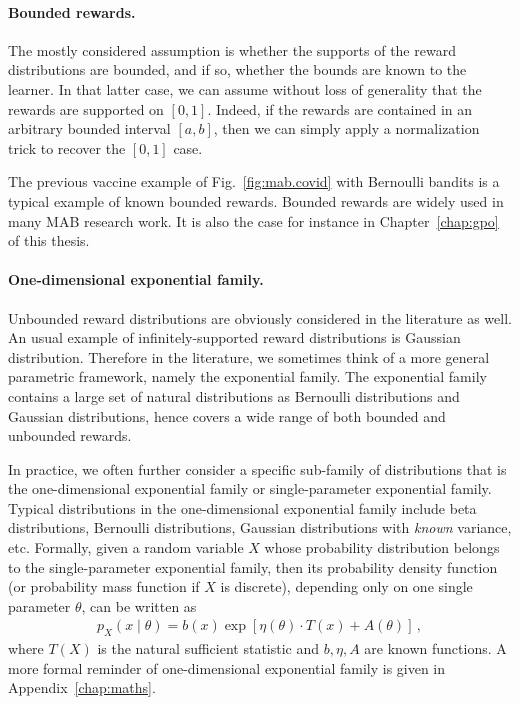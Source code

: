 \paragraph{Bounded rewards.}

The mostly considered assumption is whether the supports of the reward distributions are bounded, and if so, whether the bounds are known to the learner. In that latter case, we can assume without loss of generality that the rewards are supported on $[0,1]$. Indeed, if the rewards are contained in an arbitrary bounded interval $[a,b]$, then we can simply apply a normalization trick to recover the $[0,1]$ case.

The previous vaccine example of Fig.~\ref{fig:mab.covid} with Bernoulli bandits is a typical example of known bounded rewards. Bounded rewards are widely used in many MAB research work. It is also the case for instance in Chapter~\ref{chap:gpo} of this thesis.

\paragraph{One-dimensional exponential family.}

Unbounded reward distributions are obviously considered in the literature as well. An usual example of infinitely-supported reward distributions is Gaussian distribution. Therefore in the literature, we sometimes think of a more general parametric framework, namely the exponential family. The exponential family contains a large set of natural distributions as Bernoulli distributions and Gaussian distributions, hence covers a wide range of both bounded and unbounded rewards.

In practice, we often further consider a specific sub-family of distributions that is the \gls{one-dimensional exponential family} or \gls{single-parameter exponential family}. Typical distributions in the one-dimensional exponential family include beta distributions, Bernoulli distributions, Gaussian distributions with \emph{known} variance, etc. Formally, given a random variable $X$ whose probability distribution belongs to the single-parameter exponential family, then its \gls{probability density function} (or \gls{probability mass function} if $X$ is discrete), depending only on one single parameter $\theta$, can be written as
\begin{align}\label{eq:mab.exponential}
    p_{X}(x \mid \theta ) = b(x) \exp \left[\eta (\theta ) \cdot T(x) + A(\theta )\right]\,,
\end{align}
where $T(X)$ is the \gls{natural sufficient statistic} and $b,\eta,A$ are known functions. A more formal reminder of one-dimensional exponential family is given in Appendix~\ref{chap:maths}.

